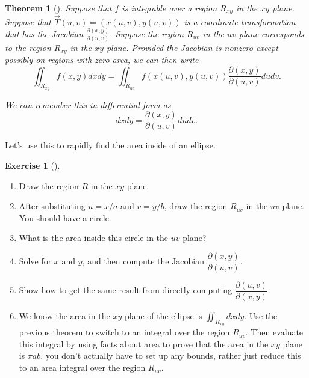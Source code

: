 \documentclass[10pt,]{book}
\theoremstyle{plain}
\newtheorem{theorem}{Theorem}[section]
\theoremstyle{definition}
\theoremstyle{definition}
\theoremstyle{definition}
\theoremstyle{definition}
\newtheorem{exploration}[project]{Exercise}
\theoremstyle{definition}
\numberwithin{equation}{section}
\newcommand{\ds}{\displaystyle}
\begin{document}
\begin{theorem}[{}]\label{theorem-11}
Suppose that \(f\) is integrable over a region \(R_{xy}\) in the \(xy\) plane. Suppose that \(\vec T(u,v)=(x(u,v),y(u,v))\) is a coordinate transformation that has the Jacobian \(\ds \frac{\partial (x,y)}{\partial (u,v)}\). Suppose the region \(R_{uv}\) in the \(uv\)-plane corresponds to the region \(R_{xy}\) in the \(xy\)-plane. Provided the Jacobian is nonzero except possibly on regions with zero area, we can then write%
\begin{equation*}
\iint_{R_{xy}} f(x,y) dxdy = \iint_{R_{uv}} f(x(u,v),y(u,v)) \frac{\partial (x,y)}{\partial (u,v)} dudv.
\end{equation*}
%
\par
We can remember this in differential form as%
\begin{equation*}
dxdy = \frac{\partial (x,y)}{\partial (u,v)} dudv.
\end{equation*}
%
\end{theorem}
Let's use this to rapidly find the area inside of an ellipse.%
\begin{exploration}[]\label{exploration-268}
\leavevmode%
\begin{enumerate}[font=\bfseries,label=(\alph*),ref=\alph*]
\item\label{task-726} Draw the region \(R\) in the \(xy\)-plane.%
\item\label{task-727} After substituting \(u=x/a\) and \(v=y/b\), draw the region \(R_{uv}\) in the \(uv\)-plane.  You should have a circle.%
\item\label{task-728} What is the area inside this circle in the \(uv\)-plane?%
\item\label{task-729} Solve for \(x\) and \(y\), and then compute the Jacobian  \(\dfrac{\partial (x,y)}{\partial (u,v)}\).%
\item\label{task-730} Show how to get the same result from directly computing \(\dfrac{\partial (u,v)}{\partial (x,y)}\).%
\item\label{task-731} We know the area in the \(xy\)-plane of the ellipse is \(\iint_{R_{xy}} dxdy\). Use the previous theorem to switch to an integral over the region \(R_{uv}\).  Then evaluate this integral by using facts about area to prove that the area in the \(xy\) plane is \(\pi a b\). you don't actually have to set up any bounds, rather just reduce this to an area integral over the region \(R_{uv}\).%
%
\end{enumerate}
\end{exploration}
\end{document}
